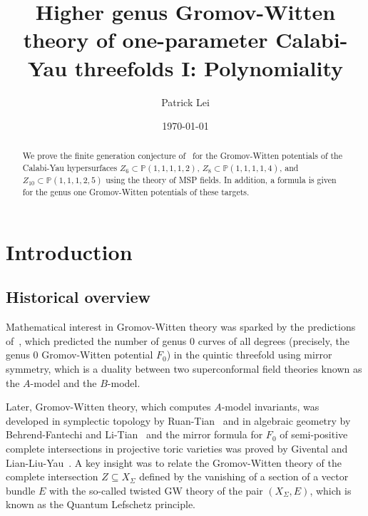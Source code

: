 \documentclass[10pt]{amsart}
\title[Polynomiality of higher genus GW]{Higher genus Gromov-Witten theory of one-parameter Calabi-Yau threefolds I: Polynomiality}
\author{Patrick Lei}
\date{\today}
\theoremstyle{definition}
\theoremstyle{remark}
\theoremstyle{plain}
\theoremstyle{definition}
\theoremstyle{remark}
\renewcommand{\P}{\mathbb{P}}
\newcommand{\1}{\mathbf{1}}
\newcommand{\2}{\mathbf{2}}
\newcommand{\3}{\mathbf{3}}
\numberwithin{equation}{section}
\begin{document}
    
\begin{abstract}
    We prove the finite generation conjecture of~\cite{yy04} for the Gromov-Witten potentials of the Calabi-Yau hypersurfaces $Z_6 \subset \P(1,1,1,1,2)$, $Z_8 \subset \P(1,1,1,1,4)$, and $Z_{10} \subset \P(1,1,1,2,5)$ using the theory of MSP fields. In addition, a formula is given for the genus one Gromov-Witten potentials of these targets.
\end{abstract}

\maketitle

\tableofcontents

\section{Introduction}
\label{sec:introduction}



\subsection{Historical overview}%
\label{sub:Historical overview}

Mathematical interest in Gromov-Witten theory was sparked by the predictions of~\cite{cdgp}, which predicted the number of genus $0$ curves of all degrees (precisely, the genus $0$ Gromov-Witten potential $F_0$) in the quintic threefold using mirror symmetry, which is a duality between two superconformal field theories known as the $A$-model and the $B$-model.

Later, Gromov-Witten theory, which computes $A$-model invariants, was developed in symplectic topology by Ruan-Tian~\cite{rtqcoh} and in algebraic geometry by Behrend-Fantechi and Li-Tian~\cite{intrinsicnc,ltgwfoundation} and the mirror formula for $F_0$ of semi-positive complete intersections in projective toric varieties was proved by Givental and Lian-Liu-Yau~\cite{eqgwinv,giventalmirror,lly,lly2}. A key insight was to relate the Gromov-Witten theory of the complete intersection $Z \subseteq X_{\Sigma}$ defined by the vanishing of a section of a vector bundle $E$ with the so-called twisted GW theory of the pair $(X_{\Sigma}, E)$, which is known as the Quantum Lefschetz principle.
\end{document}
